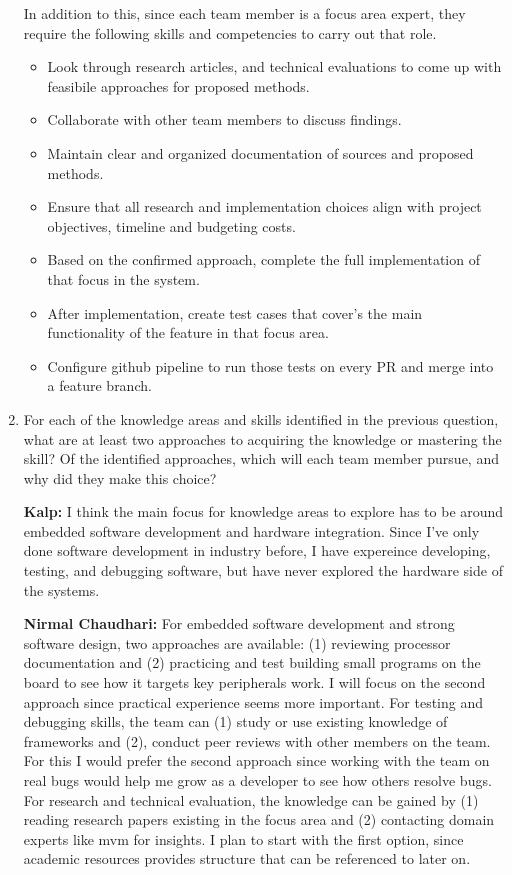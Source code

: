 \begin{enumerate}
  In addition to this, since each team member is a focus area expert, they 
  require the following skills
  and competencies to carry out that role.

  \begin{itemize}\setlength\itemsep{4pt}\setlength{\leftmargini}{2em}
    \item Look through research articles, and technical evaluations to come up 
    with feasibile approaches for proposed methods. 
    \item Collaborate with other team members to discuss findings. 
    \item Maintain clear and organized documentation of sources and proposed 
    methods. 
    \item Ensure that all research and implementation choices align with project
     objectives, timeline and budgeting costs. 
    \item Based on the confirmed approach, complete the full implementation of 
    that focus in the system. 
    \item After implementation, create test cases that cover's the main 
    functionality of the feature in that focus area. 
    \item Configure github pipeline to run those tests on every PR and merge 
    into a feature branch. 
  \end{itemize}


  \item For each of the knowledge areas and skills identified in the previous
  question, what are at least two approaches to acquiring the knowledge or
  mastering the skill?  Of the identified approaches, which will each team
  member pursue, and why did they make this choice?

  \textbf{Kalp:} I think the main focus for knowledge areas to explore has to be
  around embedded software development and hardware integration. Since I've only
  done software development in industry before, I have expereince developing, 
  testing, and debugging software, but have never explored the hardware side of
  the systems. 

  \textbf{Nirmal Chaudhari:} For embedded software development and strong 
  software design, two approaches are available: (1) reviewing processor 
  documentation and (2) practicing and test building small programs on the 
  board to see how it targets key peripherals work. I will focus on the second 
  approach since practical experience seems more important. For testing and 
  debugging skills, the team can (1) study or use existing knowledge of 
  frameworks and (2), conduct peer reviews with other members on the team. 
  For this I would prefer the second approach since working with the team 
  on real bugs would help me grow as a developer to see how others resolve bugs.
  For research and technical evaluation, the knowledge can be gained by (1) 
  reading research papers existing in the focus area and (2) contacting domain 
  experts like mvm for insights. I plan to start with the first option, 
  since academic resources provides structure that can be referenced to later on.
 

\end{enumerate}
